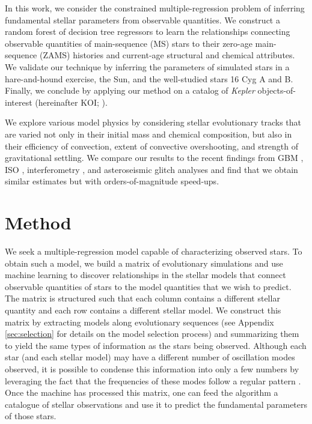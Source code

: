 \documentclass[twocolumn,twocolappendix]{aastex6}
\newif\ifref
\newcommand{\mb}[1]{\ifref\boldmath\textbf{#1}\unboldmath\else #1\fi}
\begin{document}
In this work, we consider the constrained multiple-regression problem of inferring fundamental stellar \mb{parameters} from observable \mb{quantities}. We construct a random forest of decision tree regressors to learn the relationships connecting observable quantities of main-sequence (MS) stars to their zero-age main-sequence (ZAMS) histories and  current-age structural and chemical attributes. We validate our technique by inferring the parameters of simulated stars in a hare-and-hound exercise, the Sun, and the well-studied stars 16 Cyg A and B. Finally, we conclude by applying our method on a catalog of \emph{Kepler} objects-of-interest (hereinafter KOI; \citealt{2016MNRAS.456.2183D}).  

We explore various model physics by considering stellar evolutionary tracks that are varied not only in their initial mass and chemical composition, but also in their efficiency of convection, extent of convective overshooting, and strength of gravitational settling. We compare our results to the recent findings from GBM \citep{2015MNRAS.452.2127S}, ISO \citep{2015ApJ...811L..37M}, interferometry \citep{2013MNRAS.433.1262W}, and asteroseismic glitch analyses \citep{2014ApJ...790..138V} and find that we obtain similar estimates but with orders-of-magnitude speed-ups. 


\section{Method} \label{sec:Method} 
We seek a multiple-regression model capable of characterizing observed stars. To obtain such a model, we build a matrix of evolutionary simulations and use machine learning to discover relationships in the \mb{stellar models} that connect observable quantities of stars to the model quantities that we wish to predict. \mb{The matrix is structured such that each column contains a different stellar quantity and each row contains a different stellar model.} We construct this matrix by extracting models along evolutionary sequences (see Appendix \ref{sec:selection} for details on the model selection process) and summarizing them to yield the same types of information as the stars being observed. Although each star (and each stellar model) may have a different number of \mb{oscillation} modes observed, it is possible to condense this information into only a few numbers by leveraging the fact that the frequencies of these modes follow a regular pattern \citep[for a review of solar-like oscillations, see][]{doi:10.1146/annurev-astro-082812-140938}. Once the machine has processed this matrix, one can feed the algorithm a catalogue of \mb{stellar observations} and use it to predict the \mb{fundamental} parameters of those stars.
\end{document}
